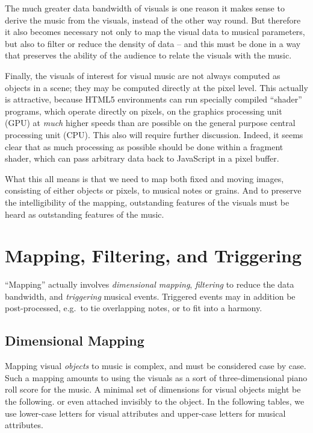 \documentclass[english,11pt,letterpaper,onecolumn]{scrartcl}
\begin{document}
The much greater data bandwidth of visuals is one reason it makes 
sense to derive the music from the visuals, instead of the other way round. But 
therefore it also becomes necessary not only to map the visual data to musical 
parameters, but also to filter or reduce the density of data -- and this must 
be done in a way that preserves the ability of the audience to relate the 
visuals with the music.

Finally, the visuals of interest for visual music are not always 
computed as objects in a scene; they may be computed directly at the 
pixel level. This actually is attractive, because HTML5 environments can run 
specially compiled ``shader'' programs, which operate directly on pixels, on 
the graphics processing unit (GPU) at \emph{much} higher speeds than are 
possible on the general purpose central processing unit (CPU). This also will 
require further discussion. Indeed, it seems clear that as much processing as 
possible should be done within a fragment shader, which can pass arbitrary 
data back to JavaScript in a pixel buffer.

What this all means is that we need to map both fixed and moving images, 
consisting of either objects or pixels, to musical notes or grains. And to 
preserve the intelligibility of the mapping, outstanding features of the 
visuals must be heard as outstanding features of the music.

\section{Mapping, Filtering, and Triggering}

``Mapping'' actually involves \emph{dimensional mapping}, \emph{filtering} to 
reduce the data bandwidth, and \emph{triggering} musical events. Triggered 
events may in addition be post-processed, e.g.\ to tie overlapping notes, or 
to fit into a harmony.

\subsection{Dimensional Mapping}

Mapping visual \emph{objects} to music is complex, and must be considered case 
by case. Such a mapping amounts to using the visuals as a sort of 
three-dimensional piano roll score for the music. A minimal set of dimensions 
for visual objects might be the following. or even attached invisibly to the 
object. In the following tables, 
we use lower-case letters for visual attributes and upper-case letters for 
musical attributes.
\end{document}
